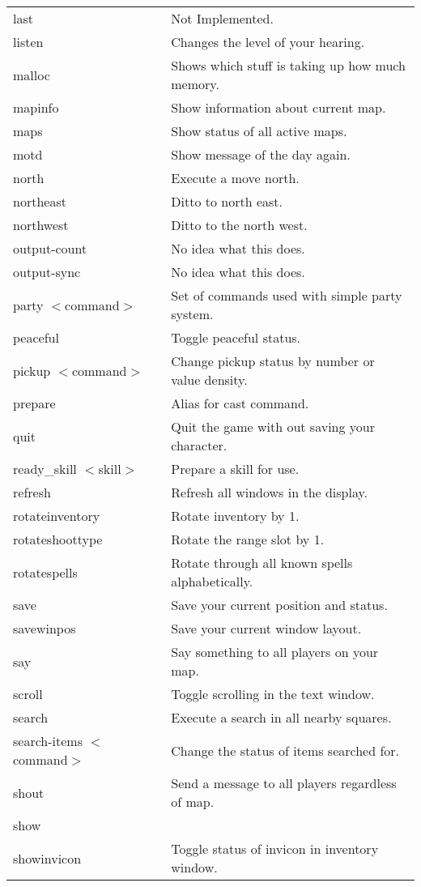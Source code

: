 {\begin{longtable}{p{4cm}p{9cm}}
last & Not Implemented. \\ 
listen & Changes the level of your hearing. \\ 
malloc & Shows which stuff is taking up how much memory. \\ 
mapinfo & Show information about current map. \\ 
maps & Show status of all active maps. \\
motd & Show message of the day again. \\ 
north & Execute a move north. \\ 
northeast & Ditto to north east. \\  
northwest & Ditto to the north west. \\ 
output-count & No idea what this does. \\ 
output-sync &  No idea what this does. \\
party $<$command$>$ & Set of commands used with simple party system. \\ 
peaceful & Toggle peaceful status. \\ 
pickup $<$command$>$ & Change pickup status by number or value density. \\ 
prepare & Alias for cast command. \\ 
quit & Quit the game with out saving your character. \\ 
ready\_skill $<$skill$>$ & Prepare a skill for use. \\ 
refresh & Refresh all windows in the display. \\ 
rotateinventory & Rotate inventory by 1. \\ 
rotateshoottype & Rotate the range slot by 1. \\ 
rotatespells & Rotate through all known spells alphabetically. \\ 
save & Save your current position and status. \\ 
savewinpos & Save your current window layout. \\ 
say & Say something to all players on your map. \\ 
scroll & Toggle scrolling in the text window. \\ 
search & Execute a search in all nearby squares.\\ 
search-items $<$command$>$ & Change the status of items searched for. \\ 
shout & Send a message to all players regardless of map.\\ 
show & \\ 
showinvicon & Toggle status of invicon in inventory window. \\ 

\end{longtable}}
